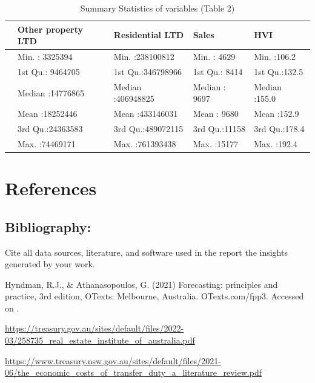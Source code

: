 \documentclass[11pt,a4paper,]{article}
\begin{document}
\begin{table}

\caption{\label{tab:statsumtwo}Summary Statistics of variables (Table 2)}
\centering
\begin{tabular}[t]{lllll}
\toprule
  & Other property LTD & Residential LTD & Sales & HVI\\
\midrule
 & Min.   : 3325394 & Min.   :238100812 & Min.   : 4629 & Min.   :106.2\\
 & 1st Qu.: 9464705 & 1st Qu.:346798966 & 1st Qu.: 8414 & 1st Qu.:132.5\\
 & Median :14776865 & Median :406948825 & Median : 9697 & Median :155.0\\
 & Mean   :18252446 & Mean   :433146031 & Mean   : 9680 & Mean   :152.9\\
 & 3rd Qu.:24363583 & 3rd Qu.:489072115 & 3rd Qu.:11158 & 3rd Qu.:178.4\\
\addlinespace
 & Max.   :74469171 & Max.   :761393438 & Max.   :15177 & Max.   :192.4\\
\bottomrule
\end{tabular}
\end{table}

\section{References}\label{references}

\subsection{Bibliography:}\label{bibliography}

Cite all data sources, literature, and software used in the report the insights generated by your work.

Hyndman, R.J., \& Athanasopoulos, G. (2021) Forecasting: principles and practice, 3rd edition, OTexts: Melbourne, Australia. OTexts.com/fpp3. Accessed on .

\url{https://treasury.gov.au/sites/default/files/2022-03/258735_real_estate_institute_of_australia.pdf}

\url{https://www.treasury.nsw.gov.au/sites/default/files/2021-06/the_economic_costs_of_transfer_duty_a_literature_review.pdf}

\printbibliography
\end{document}
